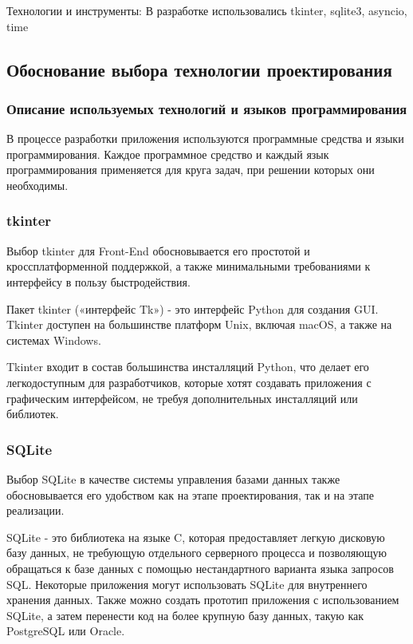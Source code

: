 Технологии и инструменты: В разработке использовались tkinter, sqlite3, asyncio, time

\subsection{Обоснование выбора технологии проектирования}

\subsubsection{Описание используемых технологий и языков программирования}

В процессе разработки приложения используются программные средства и языки программирования. Каждое программное средство и каждый язык программирования применяется для круга задач, при решении которых они необходимы.

\subsubsection {tkinter}
Выбор tkinter для Front-End обосновывается его простотой и кроссплатформенной поддержкой, а также минимальными требованиями к интерфейсу в пользу быстродействия. 

Пакет tkinter («интерфейс Tk») - это интерфейс Python для создания GUI. Tkinter доступен на большинстве платформ Unix, включая macOS, а также на системах Windows.

Tkinter входит в состав большинства инсталляций Python, что делает его легкодоступным для разработчиков, которые хотят создавать приложения с графическим интерфейсом, не требуя дополнительных инсталляций или библиотек.

\subsubsection {SQLite}
Выбор SQLite в качестве системы управления базами данных также обосновывается его удобством как на этапе проектирования, так и на этапе реализации.

SQLite - это библиотека на языке C, которая предоставляет легкую дисковую базу данных, не требующую отдельного серверного процесса и позволяющую обращаться к базе данных с помощью нестандартного варианта языка запросов SQL. Некоторые приложения могут использовать SQLite для внутреннего хранения данных. Также можно создать прототип приложения с использованием SQLite, а затем перенести код на более крупную базу данных, такую как PostgreSQL или Oracle.

